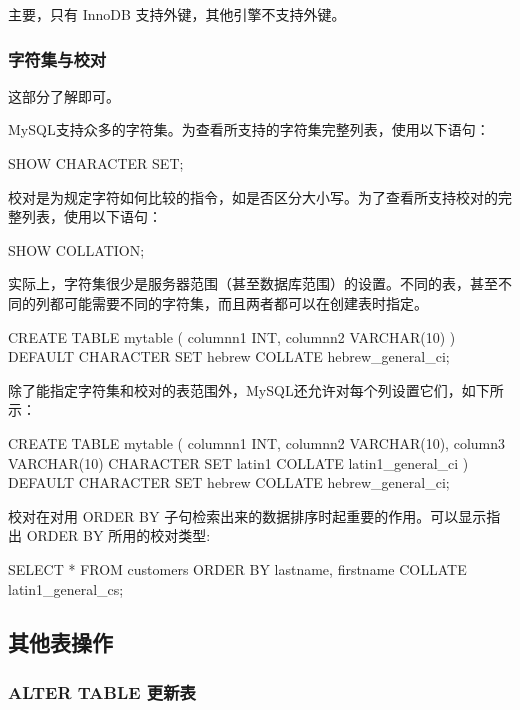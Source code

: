 主要，只有 InnoDB 支持外键，其他引擎不支持外键。

\subsubsection{字符集与校对}

这部分了解即可。

MySQL支持众多的字符集。为查看所支持的字符集完整列表，使用以下语句：

\begin{sql}
SHOW CHARACTER SET;
\end{sql}

校对是为规定字符如何比较的指令，如是否区分大小写。为了查看所支持校对的完整列表，使用以下语句：

\begin{sql}
SHOW COLLATION;
\end{sql}

实际上，字符集很少是服务器范围（甚至数据库范围）的设置。不同的表，甚至不同的列都可能需要不同的字符集，而且两者都可以在创建表时指定。

\begin{sql}
CREATE TABLE mytable (
   columnn1   INT,
   columnn2   VARCHAR(10)
) DEFAULT CHARACTER SET hebrew
  COLLATE hebrew_general_ci;
\end{sql}

除了能指定字符集和校对的表范围外，MySQL还允许对每个列设置它们，如下所示：

\begin{sql}
CREATE TABLE mytable (
   columnn1   INT,
   columnn2   VARCHAR(10),
   column3    VARCHAR(10) CHARACTER SET latin1 COLLATE latin1_general_ci
) DEFAULT CHARACTER SET hebrew
  COLLATE hebrew_general_ci;
\end{sql}

校对在对用 ORDER BY 子句检索出来的数据排序时起重要的作用。可以显示指出 ORDER BY 所用的校对类型:

\begin{sql}
SELECT * FROM customers
    ORDER BY lastname, firstname COLLATE latin1_general_cs;
\end{sql}


\subsection{其他表操作}

\subsubsection{ALTER TABLE 更新表}


